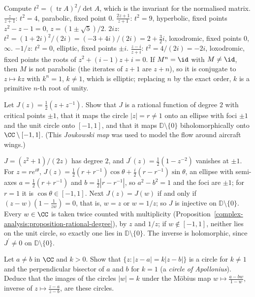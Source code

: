 \begin{solution}
Compute $t^2 = (\operatorname{tr}A)^2/\det A$, which is the invariant for the normalised matrix. $\frac{z}{z + 1}$: $t^2 = 4$, parabolic, fixed point $0$. $\frac{2z + 1}{z + 1}$: $t^2 = 9$, hyperbolic, fixed points
$z^2 - z - 1 = 0$, $z = (1 \pm \sqrt5)/2$. $2iz$: $t^2 = (1 + 2i)^2/(2i) = (-3 + 4i)/(2i) = 2 + \frac32i$, loxodromic, fixed points $0$, $\infty$. $-1/z$: $t^2 = 0$, elliptic, fixed points $\pm i$. $\frac{z - i}{z + i}$:
$t^2 = 4/(2i) = -2i$, loxodromic, fixed points the roots of $z^2 + (i - 1)z + i = 0$. If $M^n = \id$ with $M \neq \id$, then $M$ is not parabolic (the iterates of $z + 1$ are $z + n$), so it is conjugate to $z \mapsto kz$
with $k^n = 1$, $k \neq 1$, which is elliptic; replacing $n$ by the exact order, $k$ is a primitive $n$-th root of unity.
\end{solution}

\begin{exercise}\label{complex-analysis:exercise-joukowski}
Let $J(z) = \frac12(z + z^{-1})$. Show that $J$ is a rational function of degree $2$ with critical points $\pm1$, that it maps the circle $|z| = r \neq 1$ onto an ellipse with foci $\pm1$ and the unit circle onto
$[-1, 1]$, and that it maps $\mathbb{D} \setminus \{0\}$ biholomorphically onto $\CC \setminus [-1, 1]$. (This \emph{Joukowski map} was used to model the flow around aircraft wings.)
\end{exercise}

\begin{solution}
$J = (z^2 + 1)/(2z)$ has degree $2$, and $J^{\prime}(z) = \frac12(1 - z^{-2})$ vanishes at $\pm1$. For $z = re^{i\theta}$, $J(z) = \frac12(r + r^{-1})\cos\theta + \frac i2(r - r^{-1})\sin\theta$, an ellipse with semi-axes
$a = \frac12(r + r^{-1})$ and $b = \frac12|r - r^{-1}|$, so $a^2 - b^2 = 1$ and the foci are $\pm1$; for $r = 1$ it is $\cos\theta \in [-1, 1]$. Next $J(z) = J(w)$ if and only if $(z - w)(1 - \frac{1}{zw}) = 0$, that is,
$w = z$ or $w = 1/z$; so $J$ is injective on $\mathbb{D} \setminus \{0\}$. Every $w \in \CC$ is taken twice counted with multiplicity (Proposition~\ref{complex-analysis:proposition-rational-degree}), by $z$ and $1/z$;
if $w \notin [-1, 1]$, neither lies on the unit circle, so exactly one lies in $\mathbb{D} \setminus \{0\}$. The inverse is holomorphic, since $J^{\prime} \neq 0$ on $\mathbb{D} \setminus \{0\}$.
\end{solution}

\begin{exercise}\label{complex-analysis:exercise-apollonius}
Let $a \neq b$ in $\CC$ and $k > 0$. Show that $\{z : |z - a| = k|z - b|\}$ is a circle for $k \neq 1$ and the perpendicular bisector of $a$ and $b$ for $k = 1$ (a \emph{circle of Apollonius}). Deduce that the
images of the circles $|w| = k$ under the M\"obius map $w \mapsto \frac{a - bw}{1 - w}$, inverse of $z \mapsto \frac{z - a}{z - b}$, are these circles.
\end{exercise}

